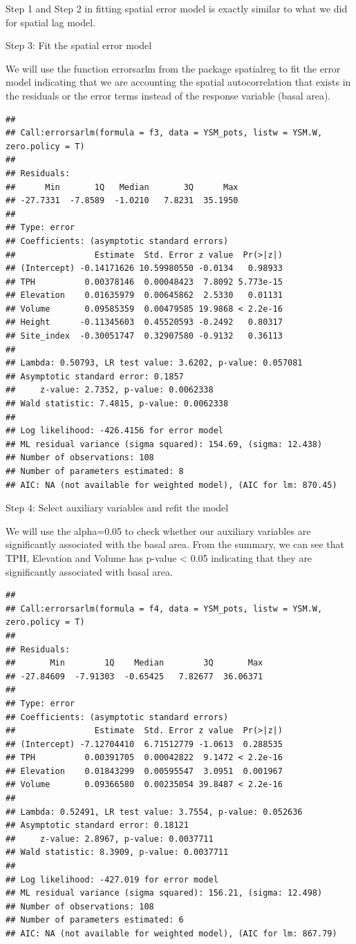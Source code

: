\documentclass[
]{book}
\begin{document}
Step 1 and Step 2 in fitting spatial error model is exactly similar to what we did for spatial lag model.

Step 3: Fit the spatial error model

We will use the function errorsarlm from the package spatialreg to fit the error model indicating that we are accounting the spatial autocorrelation that exists in the residuals or the error terms instead of the response variable (basal area).

\begin{verbatim}
## 
## Call:errorsarlm(formula = f3, data = YSM_pots, listw = YSM.W, zero.policy = T)
## 
## Residuals:
##      Min       1Q   Median       3Q      Max 
## -27.7331  -7.8589  -1.0210   7.8231  35.1950 
## 
## Type: error 
## Coefficients: (asymptotic standard errors) 
##                Estimate  Std. Error z value  Pr(>|z|)
## (Intercept) -0.14171626 10.59980550 -0.0134   0.98933
## TPH          0.00378146  0.00048423  7.8092 5.773e-15
## Elevation    0.01635979  0.00645862  2.5330   0.01131
## Volume       0.09585359  0.00479585 19.9868 < 2.2e-16
## Height      -0.11345603  0.45520593 -0.2492   0.80317
## Site_index  -0.30051747  0.32907580 -0.9132   0.36113
## 
## Lambda: 0.50793, LR test value: 3.6202, p-value: 0.057081
## Asymptotic standard error: 0.1857
##     z-value: 2.7352, p-value: 0.0062338
## Wald statistic: 7.4815, p-value: 0.0062338
## 
## Log likelihood: -426.4156 for error model
## ML residual variance (sigma squared): 154.69, (sigma: 12.438)
## Number of observations: 108 
## Number of parameters estimated: 8 
## AIC: NA (not available for weighted model), (AIC for lm: 870.45)
\end{verbatim}

Step 4: Select auxiliary variables and refit the model

We will use the alpha=0.05 to check whether our auxiliary variables are significantly associated with the basal area. From the summary, we can see that TPH, Elevation and Volume has p-value \textless{} 0.05 indicating that they are significantly associated with basal area.

\begin{verbatim}
## 
## Call:errorsarlm(formula = f4, data = YSM_pots, listw = YSM.W, zero.policy = T)
## 
## Residuals:
##       Min        1Q    Median        3Q       Max 
## -27.84609  -7.91303  -0.65425   7.82677  36.06371 
## 
## Type: error 
## Coefficients: (asymptotic standard errors) 
##                Estimate  Std. Error z value  Pr(>|z|)
## (Intercept) -7.12704410  6.71512779 -1.0613  0.288535
## TPH          0.00391705  0.00042822  9.1472 < 2.2e-16
## Elevation    0.01843299  0.00595547  3.0951  0.001967
## Volume       0.09366580  0.00235054 39.8487 < 2.2e-16
## 
## Lambda: 0.52491, LR test value: 3.7554, p-value: 0.052636
## Asymptotic standard error: 0.18121
##     z-value: 2.8967, p-value: 0.0037711
## Wald statistic: 8.3909, p-value: 0.0037711
## 
## Log likelihood: -427.019 for error model
## ML residual variance (sigma squared): 156.21, (sigma: 12.498)
## Number of observations: 108 
## Number of parameters estimated: 6 
## AIC: NA (not available for weighted model), (AIC for lm: 867.79)
\end{verbatim}
\end{document}
